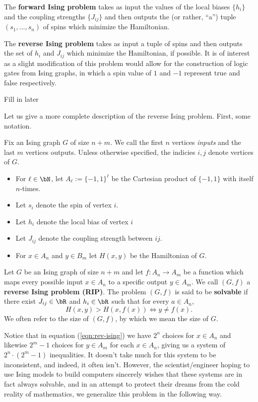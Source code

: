 The \textbf{forward Ising problem} takes as input the values of the local biases $\{h_i\}$ and the coupling strengths $\{J_{ij}\}$ and then outputs the (or rather, ``a'') tuple $(s_1,...,s_n)$ of spins which minimize the Hamiltonian.

The \textbf{reverse Ising problem} takes as input a tuple of spins and then outputs the set of $h_{i}$ and $J_{ij}$ which minimize the Hamiltonian, if possible. It is of interest as a slight modification of this problem would allow for the construction of logic gates from Ising graphs, in which a spin value of $1$ and $-1$ represent true and false respectively.

\begin{example}\label{example:and-gate}
	Fill in later
\end{example}

Let us give a more complete description of the reverse Ising problem. First, some notation.
\begin{notation}\label{not:rev-ising-problem}
	Fix an Ising graph $G$ of size $n+m$. We call the first $n$ vertices \emph{inputs} and the last $m$ vertices outputs. Unless otherwise specified, the indicies $i,j$ denote vertices of $G$.
	\begin{itemize}
		\item For $\ell \in \bN$, let $A_\ell := \{-1,1\}^\ell$ be the Cartesian product of $\{-1,1\}$ with itself $n$-times.
		\item Let $s_i$ denote the spin of vertex $i$.
		\item Let $h_i$ denote the local bias of vertex $i$
		\item Let $J_{ij}$ denote the coupling strength between $ij$.
		\item For $x\in A_n$ and $y \in B_m$ let $H(x,y)$ be the Hamiltonian of $G$.
	\end{itemize}
\end{notation}
\begin{problem}\label{prob:fixed-rev-ising}
    Let $G$ be an Ising graph of size $n+m$ and let $f:A_n\to A_m$ be a function which maps every possible input $x \in A_n$ to a specific output $y \in A_m$. We call $(G,f)$ a \textbf{reverse Ising problem (RIP)}. The problem $(G,f)$ is said to be \textbf{solvable} if there exist $J_{ij} \in \bR$ and $h_i \in \bR$ such that for every $a \in A_n$,
	\begin{equation}\label{eqn:rev-ising}
		H(x,y) > H(x,f(x)) \iff y \neq f(x).
	\end{equation}
	We often refer to the size of $(G,f)$, by which we mean the size of $G$.
\end{problem}
Notice that in equation (\ref{eqn:rev-ising}) we have $2^n$ choices for $x \in A_n$ and likewise $2^m - 1$ choices for $y \in A_m$ for each $x \in A_n$, giving us a system of $2^n\cdot (2^m - 1)$ inequalities. It doesn't take much for this system to be inconsistent, and indeed, it often isn't. However, the scientist/engineer hoping to use Ising models to build computers sincerely wishes that these systems are in fact always solvable, and in an attempt to protect their dreams from the cold reality of mathematics, we generalize this problem in the following way.

